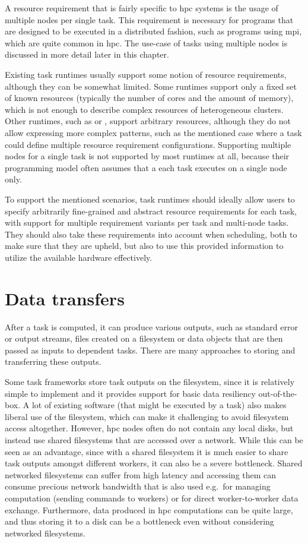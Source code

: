 A resource requirement that is fairly specific to \gls{hpc} systems is the usage
of multiple nodes per single task. This requirement is necessary for programs that are designed to
be executed in a distributed fashion, such as programs using \gls{mpi}, which are
quite common in \gls{hpc}. The use-case of tasks using multiple nodes is
discussed in more detail later in this chapter.

Existing task runtimes usually support some notion of resource requirements, although they can be
somewhat limited. Some runtimes support only a fixed set of known resources (typically the number
of cores and the amount of memory), which is not enough to describe complex resources of
heterogeneous clusters. Other runtimes, such as \dask{} or
\snakemake{}, support arbitrary resources, although they do not allow expressing
more complex patterns, such as the mentioned case where a task could define multiple resource
requirement configurations. Supporting multiple nodes for a single task is not supported by most
runtimes at all, because their programming model often assumes that a each task executes on a
single node only.

To support the mentioned scenarios, task runtimes should ideally allow users to specify arbitrarily
fine-grained and abstract resource requirements for each task, with support for multiple
requirement variants per task and multi-node tasks. They should also take these requirements into
account when scheduling, both to make sure that they are upheld, but also to use this provided
information to utilize the available hardware effectively.

\section{Data transfers}
After a task is computed, it can produce various outputs, such as standard error or output streams,
files created on a filesystem or data objects that are then passed as inputs to dependent tasks.
There are many approaches to storing and transferring these outputs.

Some task frameworks store task outputs on the filesystem, since it is relatively simple to
implement and it provides support for basic data resiliency out-of-the-box. A lot of existing
software (that might be executed by a task) also makes liberal use of the filesystem, which can
make it challenging to avoid filesystem access altogether. However, \gls{hpc}
nodes often do not contain any local disks, but instead use shared filesystems that are accessed
over a network. While this can be seen as an advantage, since with a shared filesystem it is much
easier to share task outputs amongst different workers, it can also be a severe bottleneck. Shared
networked filesystems can suffer from high latency and accessing them can consume precious network
bandwidth that is also used e.g.\ for managing computation (sending commands to workers) or for
direct worker-to-worker data exchange. Furthermore, data produced in \gls{hpc}
computations can be quite large, and thus storing it to a disk can be a bottleneck even without
considering networked filesystems.

